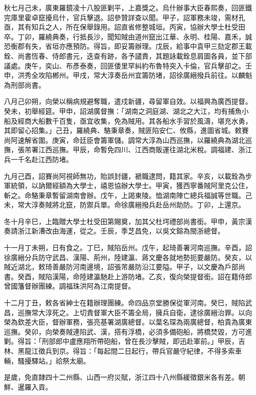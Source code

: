 \begin{pinyinscope}
秋七月己未，廣東羅鏡凌十八股匪剿平，上嘉獎之。烏什辦事大臣春熙奏，回匪鐵完庫里霍卓竄擾烏什，官兵擊退。詔參贊詳查以聞。甲子，詔軍務未竣，需材孔亟，其有知兵之人，所在保舉錄用。詔直省修整城垣。丙寅，協辦大學士杜受田卒。丁卯，羅繞典奏，行抵長沙，聞知賊由道州竄出江華、永明、桂陽、嘉禾，誠恐衡郡有失，省垣亦應預防。得旨，即妥籌辦理。戊辰，給事中袁甲三劾定郡王載銓、尚書恆春、侍郎書元，迭查有跡，各予譴責，其題詠載銓息肩圖各員，並下部議處。庚午，奕山、布彥泰奏，回匪倭里罕糾約布魯特突入卡倫，官兵擊卻之。壬申，洪秀全攻陷郴州。甲戌，常大淳奏岳州宜籌防堵，詔徐廣縉撥兵前往。以麟魁為刑部尚書。

八月己卯朔，向榮以稱病規避奪職，遣戍新疆，尋留軍自效。以福興為廣西提督。癸未，初舉經筵。甲申，詔湖廣督撫：「湖南之洞庭湖、湖北之大江，均有捕魚小船及經商大船數千百隻，亟宜收集，免為賊用。其各船水手習於風濤，堪充水勇，其即留心招集。」己丑，羅繞典、駱秉章奏，賊匪陷安仁、攸縣，進圖省城。敕賽尚阿速解省圍。庚寅，命廷臣會籌軍儲。調常大淳為山西巡撫，以羅繞典為湖北巡撫，張芾署江西巡撫。甲辰，命暫免四川、江西商販運往湖北米稅。調福建、浙江兵一千名赴江西防堵。

九月己酉，詔賽尚阿視師無功，貽誤封疆，褫職逮問，籍其家。辛亥，以載銓為步軍統領，以訥爾經額為大學士，禧恩協辦大學士。甲寅，獲西寧番賊阿里克公住，斬之。命駱秉章暫留湖南會辦。戊午，上謁東陵。恤湖南陣亡總兵福誠等世職。己未，常大淳奏賊將北竄，防禦兵單。命徐廣縉撥兵赴岳州助防。丁卯，上還京。

冬十月辛巳，上臨贈大學士杜受田第賜奠，加其父杜堮禮部尚書銜。甲申，黃宗漢奏請浙江新漕改由海運，從之。壬辰，季芝昌免，以吳文鎔為閩浙總督。

十一月丁未朔，日有食之。丁巳，賊陷岳州。戊午，起琦善署河南巡撫。辛酉，詔徐廣縉分兵防守武昌、漢陽、荊州，陸建瀛、蔣文慶各就地勢扼要嚴防。癸亥，以賊近湖北，敕琦善嚴防河南邊境，詔張芾嚴防沿江要隘。甲子，以文慶為戶部尚書。癸酉，賊陷漢陽，命陸建瀛馳赴上游防堵。乙亥，復向榮提督銜。詔在籍侍郎曾國籓督辦團練。調福珠洪阿為江南提督。

十二月丁丑，敕各省紳士在籍辦理團練。命四品京堂勝保從軍河南。癸巳，賊陷武昌，巡撫常大淳死之。上切責督軍大臣不籌全局，擁兵自衛，逮徐廣縉治罪。以向榮為欽差大臣，督辦軍務，張亮基署湖廣總督。以葉名琛為兩廣總督，柏貴為廣東巡撫。癸卯，向榮奏賊連陷武、漢，搭有浮橋，必須多備砲船，將橋焚毀，方可進剿。得旨：「刑部郎中盧應翔所帶砲船，曾在長沙擊賊，即迅赴軍前。」甲辰，吉林、黑龍江徵兵到京。得旨：「每起間二日起行，帶兵官嚴守紀律，不得多索車輛，騷擾驛站。」祫祭太廟。

是歲，免直隸四十二州縣、山西一府災賦，浙江四十八州縣緩徵銀米各有差。朝鮮、暹羅入貢。


\end{pinyinscope}
